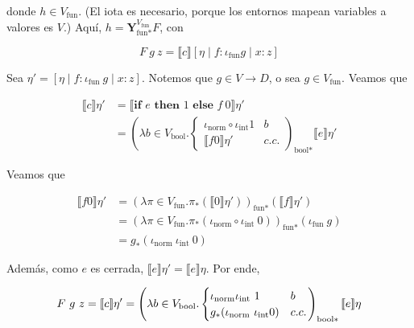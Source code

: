 \documentclass[article, 12pt]{article}
\begin{document}
donde $h \in V_{\text{fun}}$. (El iota es necesario, porque los entornos mapean
variables a valores es $V$.) Aquí, $h =
\textbf{Y}_{\text{fun}*}^{V_{\text{fun}}} F$, con 

\begin{equation*}
    F ~ g ~ z = \llbracket c \rrbracket[\eta \mid f : \iota_{\text{fun}} g \mid
    x : z]
\end{equation*}

Sea $\eta' = [\eta \mid f : \iota_{\text{fun}} ~ g \mid x : z]$. Notemos que $g
\in V \to D$, o sea $g \in V_{\text{fun}}$. Veamos que 

\begin{align*}
    \llbracket c \rrbracket\eta' 
&= \llbracket\textbf{if } e \textbf{ then }
1\textbf{ else } f ~ 0 \rrbracket\eta' \\ 
&= \left(\lambda b \in V_{\text{bool}}. \begin{cases}
    \iota_{\text{norm}} \circ \iota_{\text{int}} 1 &  b \\ 
    \llbracket f 0 \rrbracket \eta' & c.c.
\end{cases}\right)_{\text{bool}*} \llbracket e \rrbracket\eta'
\end{align*}

Veamos que 

\begin{align*}
    \llbracket f0 \rrbracket\eta' 
    &= (\lambda \pi \in V_{\text{fun}}.
    \pi_*(\llbracket 0 \rrbracket\eta'))_{\text{fun}*} (\llbracket f
    \rrbracket\eta') \\ 
    &=(\lambda \pi \in V_{\text{fun}}.\pi_*(\iota_{\text{norm}} \circ
    \iota_{\text{int}} ~ 0))_{\text{fun}*} (\iota_{\text{fun}} ~ g) \\ 
    &=g_*(\iota_{\text{norm}} ~ \iota_{\text{int}} ~ 0) 
\end{align*}

Además, como $e$ es cerrada, $\llbracket e \rrbracket\eta' = \llbracket e
\rrbracket\eta$. Por ende,

\begin{equation*}
    F ~ g ~ z = \llbracket c \rrbracket\eta' = \left( \lambda b \in V_{\text{bool}}.\begin{cases}
            \iota_{\text{norm}} \iota_{\text{int}} ~ 1 & b \\ 
            g_*(\iota_{\text{norm}} ~ \iota_{\text{int}} 0) & c.c.
    \end{cases} \right)_{\text{bool}*} \llbracket e \rrbracket\eta \\ 
\end{equation*}
\end{document}
